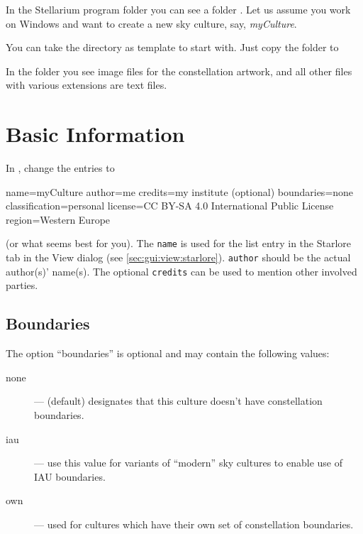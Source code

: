 In the Stellarium program folder you can see a folder
. Let us assume you work on Windows and want to create a
new sky culture, say, \emph{myCulture}.

You can take the  directory as template to start with. Just copy the folder 
 to

In the folder you see image files for the constellation artwork, and all
other files with various extensions are text files. 


\section{Basic Information}
\label{sec:skycultures:info.ini}


In , change the entries to 
\begin{configfile}[\scriptsize]
[info]
name=myCulture
author=me
credits=my institute (optional)
boundaries=none
classification=personal
license=CC BY-SA 4.0 International Public License
region=Western Europe
\end{configfile}

\noindent (or what seems best for you). The \texttt{name} is used for the list entry in
the Starlore tab in the View dialog (see \ref{sec:gui:view:starlore}). \texttt{author} should be the actual author(s)' name(s). 
The optional \texttt{credits}  can be used to mention other involved parties. 

\subsection{Boundaries}
The option ``boundaries'' is optional and may contain the following values:
\begin{description}
\item[none] --- (default) designates that this culture doesn't have constellation boundaries.
\item[iau] --- use this value for variants of ``modern'' sky cultures to enable use of IAU boundaries.
\item[own] --- used for cultures which have their own set of constellation boundaries.
\end{description}

